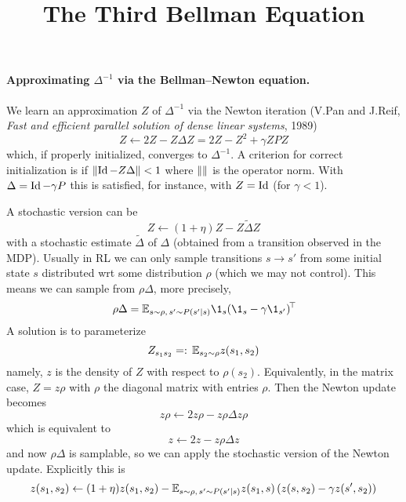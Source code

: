 \documentclass[11pt,a4paper]{article}
\title{The Third Bellman Equation}
\author{}
\begin{document}
\maketitle

\paragraph{Approximating $\Delta^{-1}$ via the Bellman--Newton equation.}
We learn an approximation $Z$ of $\Delta^{-1}$ via the Newton iteration
(V.Pan and J.Reif, \emph{Fast and efficient parallel solution of dense
linear systems}, 1989)
\begin{equation}
Z\gets 2Z-Z\Delta Z=2Z-Z^2+\gamma ZPZ
\end{equation}
which, if properly initialized, converges to $\Delta^{-1}$. A criterion
for correct initialization is if $\left\lVert\operatorname{Id}-Z\Delta\right\rVert<1$ where $\left\lVert\right\rVert$
is the operator norm. With $\Delta=\operatorname{Id}-\gamma P$ this is satisfied, for
instance, with $Z=\operatorname{Id}$ (for $\gamma<1$).

A stochastic version can be
\begin{equation}
Z\gets (1+\eta) Z-Z\tilde \Delta Z
\end{equation}
with a stochastic estimate $\tilde \Delta$ of $\Delta$ (obtained from a
transition observed in the MDP). Usually in RL we can only sample
transitions $s\to s'$ from some initial state $s$ distributed wrt some
distribution $\rho$ (which we may not control). This means we can sample
from $\rho \Delta$, more precisely,
\begin{equation}
\rho\Delta=\E_{s\sim \rho,\,s'\sim P(s'|s)}
\1_s\transp{(\1_s-\gamma\1_{s'})}
\end{equation}
A solution is to parameterize
\begin{equation}
Z_{s_1s_2}=\mathrel{\mathop{:}} \,\mathbb{E}_{s_2\sim \rho} z(s_1,s_2)
\end{equation}
namely, $z$ is the density of $Z$ with respect to $\rho(s_2)$.
Equivalently, in the matrix case, $Z=z\rho$ with $\rho$ the diagonal
matrix with entries $\rho$. Then the Newton update becomes
\begin{equation}
z\rho\gets 2z\rho-z\rho\Delta z\rho
\end{equation}
which is equivalent to
\begin{equation}
z\gets 2z-z\rho\Delta z
\end{equation}
and now $\rho \Delta$ is samplable,
so we can apply the stochastic version of the Newton update. Explicitly
this is
\begin{equation}
z(s_1,s_2)\gets (1+\eta) z(s_1,s_2)-
\mathbb{E}_{s\sim \rho,\,s'\sim P(s'|s)}z(s_1,s)\left(z(s,s_2)-\gamma
z(s',s_2)\right)
\end{equation}
\end{document}
